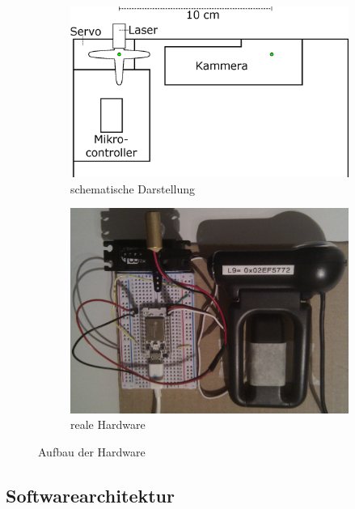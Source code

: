 \documentclass[ngerman,a4paper,parskip=half]{scrartcl}
\begin{document}
\begin{figure}
	\centering
	\begin{subfigure}{0.45\textwidth}
		\includegraphics[width=\textwidth]{includes/hardware_schematic}
		\caption{schematische Darstellung}
	\end{subfigure}
	\hfill
	\begin{subfigure}{0.45\textwidth}
		\includegraphics[width=\textwidth]{includes/hardware}
		\caption{reale Hardware}
	\end{subfigure}
	\caption{Aufbau der Hardware}
	\label{fig:hardware}
\end{figure}

\subsection{Softwarearchitektur}
\end{document}
